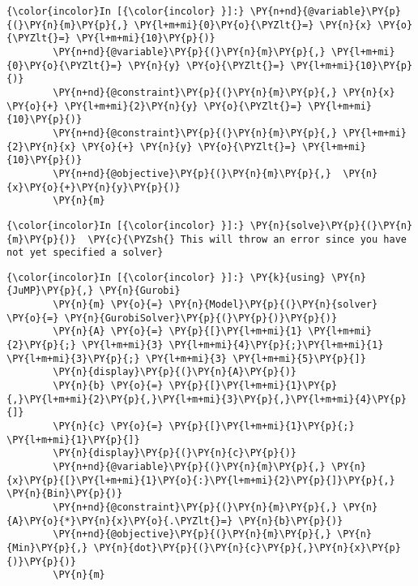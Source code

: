     \begin{Verbatim}[commandchars=\\\{\}]
{\color{incolor}In [{\color{incolor} }]:} \PY{n+nd}{@variable}\PY{p}{(}\PY{n}{m}\PY{p}{,} \PY{l+m+mi}{0}\PY{o}{\PYZlt{}=} \PY{n}{x} \PY{o}{\PYZlt{}=} \PY{l+m+mi}{10}\PY{p}{)}
        \PY{n+nd}{@variable}\PY{p}{(}\PY{n}{m}\PY{p}{,} \PY{l+m+mi}{0}\PY{o}{\PYZlt{}=} \PY{n}{y} \PY{o}{\PYZlt{}=} \PY{l+m+mi}{10}\PY{p}{)}
        \PY{n+nd}{@constraint}\PY{p}{(}\PY{n}{m}\PY{p}{,} \PY{n}{x} \PY{o}{+} \PY{l+m+mi}{2}\PY{n}{y} \PY{o}{\PYZlt{}=} \PY{l+m+mi}{10}\PY{p}{)}
        \PY{n+nd}{@constraint}\PY{p}{(}\PY{n}{m}\PY{p}{,} \PY{l+m+mi}{2}\PY{n}{x} \PY{o}{+} \PY{n}{y} \PY{o}{\PYZlt{}=} \PY{l+m+mi}{10}\PY{p}{)}
        \PY{n+nd}{@objective}\PY{p}{(}\PY{n}{m}\PY{p}{,}  \PY{n}{x}\PY{o}{+}\PY{n}{y}\PY{p}{)}
        \PY{n}{m}
\end{Verbatim}


    \begin{Verbatim}[commandchars=\\\{\}]
{\color{incolor}In [{\color{incolor} }]:} \PY{n}{solve}\PY{p}{(}\PY{n}{m}\PY{p}{)}  \PY{c}{\PYZsh{} This will throw an error since you have not yet specified a solver}
\end{Verbatim}


    \begin{Verbatim}[commandchars=\\\{\}]
{\color{incolor}In [{\color{incolor} }]:} \PY{k}{using} \PY{n}{JuMP}\PY{p}{,} \PY{n}{Gurobi}
        \PY{n}{m} \PY{o}{=} \PY{n}{Model}\PY{p}{(}\PY{n}{solver} \PY{o}{=} \PY{n}{GurobiSolver}\PY{p}{(}\PY{p}{)}\PY{p}{)}
        \PY{n}{A} \PY{o}{=} \PY{p}{[}\PY{l+m+mi}{1} \PY{l+m+mi}{2}\PY{p}{;} \PY{l+m+mi}{3} \PY{l+m+mi}{4}\PY{p}{;}\PY{l+m+mi}{1} \PY{l+m+mi}{3}\PY{p}{;} \PY{l+m+mi}{3} \PY{l+m+mi}{5}\PY{p}{]}
        \PY{n}{display}\PY{p}{(}\PY{n}{A}\PY{p}{)}
        \PY{n}{b} \PY{o}{=} \PY{p}{[}\PY{l+m+mi}{1}\PY{p}{,}\PY{l+m+mi}{2}\PY{p}{,}\PY{l+m+mi}{3}\PY{p}{,}\PY{l+m+mi}{4}\PY{p}{]}
        \PY{n}{c} \PY{o}{=} \PY{p}{[}\PY{l+m+mi}{1}\PY{p}{;} \PY{l+m+mi}{1}\PY{p}{]}
        \PY{n}{display}\PY{p}{(}\PY{n}{c}\PY{p}{)}
        \PY{n+nd}{@variable}\PY{p}{(}\PY{n}{m}\PY{p}{,} \PY{n}{x}\PY{p}{[}\PY{l+m+mi}{1}\PY{o}{:}\PY{l+m+mi}{2}\PY{p}{]}\PY{p}{,} \PY{n}{Bin}\PY{p}{)}
        \PY{n+nd}{@constraint}\PY{p}{(}\PY{n}{m}\PY{p}{,} \PY{n}{A}\PY{o}{*}\PY{n}{x}\PY{o}{.\PYZlt{}=} \PY{n}{b}\PY{p}{)}
        \PY{n+nd}{@objective}\PY{p}{(}\PY{n}{m}\PY{p}{,} \PY{n}{Min}\PY{p}{,} \PY{n}{dot}\PY{p}{(}\PY{n}{c}\PY{p}{,}\PY{n}{x}\PY{p}{)}\PY{p}{)}
        \PY{n}{m}
\end{Verbatim}


